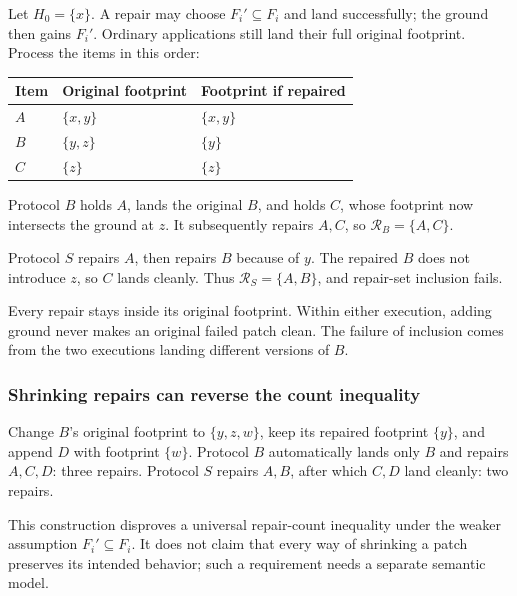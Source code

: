 \documentclass[pdflatex,sn-mathphys-ay]{sn-jnl}
\theoremstyle{thmstyleone}
\theoremstyle{thmstylethree}
\begin{document}
\begin{appendices}
Let \(H_0=\{x\}\). A repair may choose \(F_i'\subseteq F_i\) and land successfully; the ground then gains \(F_i'\). Ordinary applications still land their full original footprint. Process the items in this order:

\begin{center}
\centering\small
\setlength{\tabcolsep}{4pt}
\renewcommand{\arraystretch}{1.12}
\begin{tabularx}{\textwidth}{@{}XXX@{}}
\toprule
Item & Original footprint & Footprint if repaired \\
\midrule
\(A\) & \(\{x,y\}\) & \(\{x,y\}\) \\
\addlinespace[3pt]
\(B\) & \(\{y,z\}\) & \(\{y\}\) \\
\addlinespace[3pt]
\(C\) & \(\{z\}\) & \(\{z\}\) \\
\bottomrule
\end{tabularx}
\end{center}

Protocol \(B\) holds \(A\), lands the original \(B\), and holds \(C\), whose footprint now intersects the ground at \(z\). It subsequently repairs \(A,C\), so \(\mathcal R_B=\{A,C\}\).

Protocol \(S\) repairs \(A\), then repairs \(B\) because of \(y\). The repaired \(B\) does not introduce \(z\), so \(C\) lands cleanly. Thus \(\mathcal R_S=\{A,B\}\), and repair-set inclusion fails.

Every repair stays inside its original footprint. Within either execution, adding ground never makes an original failed patch clean. The failure of inclusion comes from the two executions landing different versions of \(B\).

\subsubsection{Shrinking repairs can reverse the count inequality}\label{app:shrinking-count}

Change \(B\)'s original footprint to \(\{y,z,w\}\), keep its repaired footprint \(\{y\}\), and append \(D\) with footprint \(\{w\}\). Protocol \(B\) automatically lands only \(B\) and repairs \(A,C,D\): three repairs. Protocol \(S\) repairs \(A,B\), after which \(C,D\) land cleanly: two repairs.

This construction disproves a universal repair-count inequality under the weaker assumption \(F_i'\subseteq F_i\). It does not claim that every way of shrinking a patch preserves its intended behavior; such a requirement needs a separate semantic model.


\end{appendices}
\end{document}
